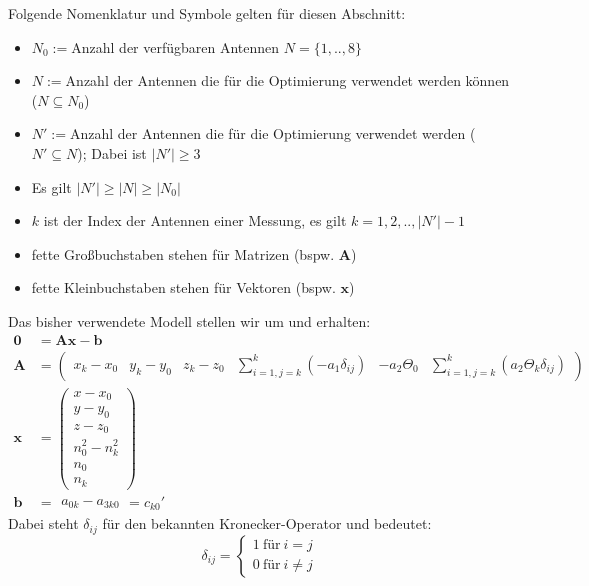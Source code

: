 {
\small
Folgende Nomenklatur und Symbole gelten für diesen Abschnitt:
\begin{itemize}[itemsep=0mm]
	\item	$N_0:=$Anzahl der verfügbaren Antennen $N=\{1,..,8\}$
	\item	$N:=$Anzahl der Antennen die für die Optimierung verwendet werden können ($N \subseteq N_0$)    
	\item	$N':=$Anzahl der Antennen die für die Optimierung verwendet werden ($N' \subseteq N$); Dabei ist $|N'| \geq 3$
	\item	Es gilt $|N'| \geq |N| \geq |N_0|$   
	\item	$k$ ist der Index der Antennen einer Messung, es gilt $k = 1,2,..,|N'|-1$
	\item	fette Großbuchstaben stehen für Matrizen (bspw. $\mathbf{A}$)
	\item	fette Kleinbuchstaben stehen für Vektoren (bspw. $\mathbf{x}$)
\end{itemize}
%
Das bisher verwendete Modell stellen wir um und erhalten:
\begin{align}
%
\mathbf{0}&=\mathbf{A}\mathbf{x}-\mathbf{b}\\
\mathbf{A}&=
\left(
	\begin{array}{cccccc}
		x_k-x_0 & y_k-y_0 & z_k-z_0 & \sum_{i=1,j=k}^{k}(-a_1\delta_{ij}) &  -a_2\Theta_0 & \sum_{i=1,j=k}^{k}(a_2\Theta_k\delta_{ij})
	\end{array}
\right)\nonumber\\
%
\mathbf{x}&=
\left(
   \begin{array}{c}
	   x-x_0\\
	   y-y_0\\
	   z-z_0\\
	   n_0^2-n_k^2\\
	   n_0\\
	   n_k
   \end{array}
\right)\nonumber\\
%
\mathbf{b}&=
	\begin{array}{c}
		a_{0k}-a_{3k0} 
	\end{array}
	= c_{k0}'\nonumber
\end{align}
%
Dabei steht $\delta_{ij}$ für den bekannten Kronecker-Operator und bedeutet:
\begin{equation*}
\delta_{ij} = \begin{cases}1 ~\text{für}~ i=j\\ 0 ~\text{für}~ i\neq j\end{cases}
\end{equation*}
}
